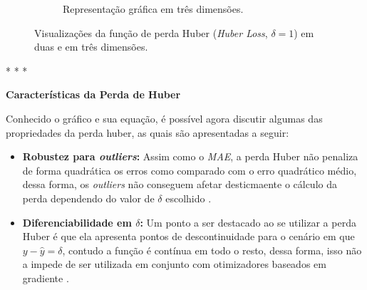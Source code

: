 \begin{figure}[h!]
\begin{subfigure}[b]{0.48\textwidth}
        \caption{Representação gráfica em três dimensões.} %
        \label{fig:huber-3d}
    \end{subfigure}

    \caption{Visualizações da função de perda Huber (\textit{Huber Loss}, $\delta=1$) em duas e em três dimensões.}
    \label{fig:huber-loss} %
\end{figure}

\medskip
\begin{center}
 * * *
\end{center}
\medskip

\textbf{Características da Perda de Huber}
\vspace{1em}

Conhecido o gráfico e sua equação, é possível agora discutir algumas das propriedades da perda huber, as quais são apresentadas a seguir:

\begin{itemize}
    \item \textbf{Robustez para \textit{outliers}:} Assim como o \textit{MAE}, a perda Huber não penaliza de forma quadrática os erros como comparado com o erro quadrático médio, dessa forma, os \textit{outliers} não conseguem afetar desticmaente o cálculo da perda dependendo do valor de $\delta$ escolhido \parencite{LossesArticle}.
    \item \textbf{Diferenciabilidade em $\delta$:} Um ponto a ser destacado ao se utilizar a perda Huber é que ela apresenta pontos de descontinuidade para o cenário em que $y - \hat{y} = \delta$, contudo a função é contínua em todo o resto, dessa forma, isso não a impede de ser utilizada em conjunto com otimizadores baseados em gradiente \parencite{LossesArticle}.
\end{itemize}

